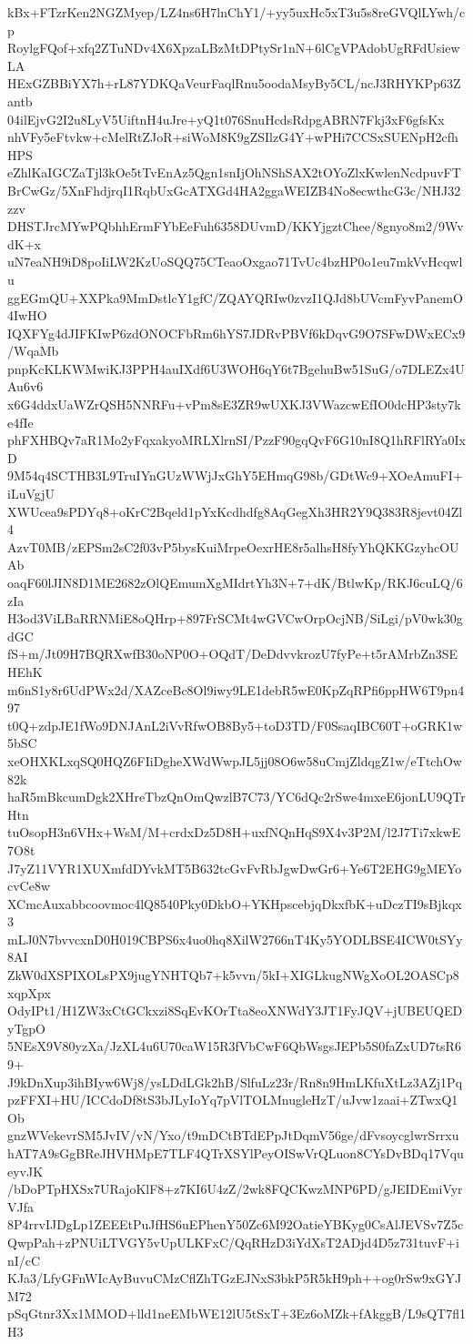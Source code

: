 kBx+FTzrKen2NGZMyep/LZ4ns6H7lnChY1/+yy5uxHc5xT3u5s8reGVQlLYwh/cp
RoylgFQof+xfq2ZTuNDv4X6XpzaLBzMtDPtySr1nN+6lCgVPAdobUgRFdUsiewLA
HExGZBBiYX7h+rL87YDKQaVeurFaqlRnu5oodaMsyBy5CL/ncJ3RHYKPp63Zantb
04ilEjvG2I2u8LyV5UiftnH4uJre+yQ1t076SnuHcdsRdpgABRN7Fkj3xF6gfsKx
nhVFy5eFtvkw+cMelRtZJoR+siWoM8K9gZSIlzG4Y+wPHi7CCSxSUENpH2cfhHPS
eZhlKaIGCZaTjl3kOe5tTvEnAz5Qgn1snIjOhNShSAX2tOYoZlxKwlenNcdpuvFT
BrCwGz/5XnFhdjrqI1RqbUxGcATXGd4HA2ggaWEIZB4No8ecwthcG3c/NHJ32zzv
DHSTJrcMYwPQbhhErmFYbEeFuh6358DUvmD/KKYjgztChee/8gnyo8m2/9WvdK+x
uN7eaNH9iD8poIiLW2KzUoSQQ75CTeaoOxgao71TvUc4bzHP0o1eu7mkVvHcqwlu
ggEGmQU+XXPka9MmDstlcY1gfC/ZQAYQRIw0zvzI1QJd8bUVcmFyvPanemO4IwHO
IQXFYg4dJIFKIwP6zdONOCFbRm6hYS7JDRvPBVf6kDqvG9O7SFwDWxECx9/WqaMb
pnpKcKLKWMwiKJ3PPH4auIXdf6U3WOH6qY6t7BgehuBw51SuG/o7DLEZx4UAu6v6
x6G4ddxUaWZrQSH5NNRFu+vPm8sE3ZR9wUXKJ3VWazcwEfIO0dcHP3sty7ke4fIe
phFXHBQv7aR1Mo2yFqxakyoMRLXlrnSI/PzzF90gqQvF6G10nI8Q1hRFlRYa0IxD
9M54q4SCTHB3L9TruIYnGUzWWjJxGhY5EHmqG98b/GDtWc9+XOeAmuFI+iLuVgjU
XWUcea9sPDYq8+oKrC2Bqeld1pYxKcdhdfg8AqGegXh3HR2Y9Q383R8jevt04Zl4
AzvT0MB/zEPSm2sC2f03vP5bysKuiMrpeOexrHE8r5alhsH8fyYhQKKGzyhcOUAb
oaqF60lJIN8D1ME2682zOlQEmumXgMIdrtYh3N+7+dK/BtlwKp/RKJ6cuLQ/6zIa
H3od3ViLBaRRNMiE8oQHrp+897FrSCMt4wGVCwOrpOcjNB/SiLgi/pV0wk30gdGC
fS+m/Jt09H7BQRXwfB30oNP0O+OQdT/DeDdvvkrozU7fyPe+t5rAMrbZn3SEHEhK
m6nS1y8r6UdPWx2d/XAZceBc8Ol9iwy9LE1debR5wE0KpZqRPfi6ppHW6T9pn497
t0Q+zdpJE1fWo9DNJAnL2iVvRfwOB8By5+toD3TD/F0SsaqIBC60T+oGRK1w5bSC
xeOHXKLxqSQ0HQZ6FIiDgheXWdWwpJL5jj08O6w58uCmjZldqgZ1w/eTtchOw82k
haR5mBkcumDgk2XHreTbzQnOmQwzlB7C73/YC6dQc2rSwe4mxeE6jonLU9QTrHtn
tuOsopH3n6VHx+WsM/M+crdxDz5D8H+uxfNQnHqS9X4v3P2M/l2J7Ti7xkwE7O8t
J7yZ11VYR1XUXmfdDYvkMT5B632tcGvFvRbJgwDwGr6+Ye6T2EHG9gMEYocvCe8w
XCmcAuxabbcoovmoc4lQ8540Pky0DkbO+YKHpscebjqDkxfbK+uDczTI9sBjkqx3
mLJ0N7bvvcxnD0H019CBPS6x4uo0hq8XilW2766nT4Ky5YODLBSE4ICW0tSYy8AI
ZkW0dXSPIXOLsPX9jugYNHTQb7+k5vvn/5kI+XIGLkugNWgXoOL2OASCp8xqpXpx
OdyIPt1/H1ZW3xCtGCkxzi8SqEvKOrTta8eoXNWdY3JT1FyJQV+jUBEUQEDyTgpO
5NEsX9V80yzXa/JzXL4u6U70caW15R3fVbCwF6QbWsgsJEPb5S0faZxUD7tsR69+
J9kDnXup3ihBIyw6Wj8/ysLDdLGk2hB/SlfuLz23r/Rn8n9HmLKfuXtLz3AZj1Pq
pzFFXI+HU/ICCdoDf8tS3bJLyIoYq7pVlTOLMnugleHzT/uJvw1zaai+ZTwxQ1Ob
gnzWVekevrSM5JvIV/vN/Yxo/t9mDCtBTdEPpJtDqmV56ge/dFvsoycglwrSrrxu
hAT7A9sGgBReJHVHMpE7TLF4QTrXSYlPeyOISwVrQLuon8CYsDvBDq17VqueyvJK
/bDoPTpHXSx7URajoKlF8+z7KI6U4zZ/2wk8FQCKwzMNP6PD/gJEIDEmiVyrVJfa
8P4rrvIJDgLp1ZEEEtPuJfHS6uEPhenY50Zc6M92OatieYBKyg0CsAlJEVSv7Z5c
QwpPah+zPNUiLTVGY5vUpULKFxC/QqRHzD3iYdXsT2ADjd4D5z731tuvF+inI/cC
KJa3/LfyGFnWIcAyBuvuCMzCflZhTGzEJNxS3bkP5R5kH9ph++og0rSw9xGYJM72
pSqGtnr3Xx1MMOD+lld1neEMbWE12lU5tSxT+3Ez6oMZk+fAkggB/L9sQT7fl1H3
